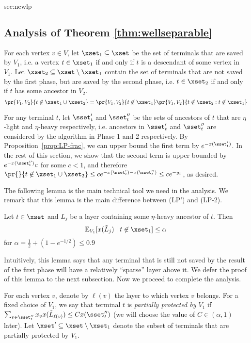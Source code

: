 \begin{appendixextra}{sec:newlp}{\subsection{Analysis of Theorem \ref{thm:wellseparable}}}
For each vertex $v \in V$, let $\xset_1 \subseteq \xset$ be the set of terminals that are saved by $V_1$, i.e. a vertex $t \in \xset_1$ if and only if $t$ is a descendant of some vertex in $V_1$.  
Let $\xset_2 \subseteq \xset \setminus \xset_1$ contain the set of terminals that are not saved by the first phase, but are saved by the second phase, i.e. $t \in \xset_2$ if and only if $t$ has some ancestor in $V_2$.  
\[\pr{V_1, V_2}{t \not \in \xset_1 \cup \xset_2} = \pr{V_1, V_2}{t \not \in \xset_1}
                                  \pr{V_1, V_2}{t \not \in \xset_2 : t \not \in \xset_1}\]

\newcommand{\avgsumgoodterm}[0]{\ensuremath{\sum_{i \in \lset_{t,2}}x_{v_{i,t}} x(\tilde L_{i,t})}}

For any terminal $t$, let $\sset'_t$ and $\sset''_t$ be the sets of ancestors of $t$ that are $\eta$-light and $\eta$-heavy respectively, i.e. ancestors in $\sset'_t$ and $\sset''_t$ are considered by the algorithm in Phase 1 and 2 respectively. 
By Proposition~\ref{prop:LP-frac}, we can upper bound the first term by $e^{-x(\sset'_t)}$. 
In the rest of this section, we show that the second term is upper bounded by $e^{-x(\sset''_t)} c$ for some $c <1$, and therefore $\pr{}{t \not \in \xset_1 \cup \xset_2} \leq c e^{-x(\sset'_t) - x(\sset''_t)} \leq c e^{-y_t}$, as desired.   

The following lemma is the main technical tool we need in the analysis.
We remark that this lemma is the main difference between (LP') and (LP-2).  
\begin{lemma}
\label{newlp:advantage}
Let $t \in \xset$ and  $L_j$ be a
layer containing some $\eta$-heavy ancestor of $t$.  
Then 
\[{\mathbb E}_{V_1} [x(\tilde L_j) \mid t \not \in \xset_1] \leq  \alpha \]
for $\displaystyle{\alpha = \frac12 + (1-e^{-1/2}) \leq 0.9}$ 
\end{lemma}

Intuitively, this lemma says that any terminal that is still not saved by the result of the first phase will have a relatively ``sparse'' layer above it.   
We defer the proof of this lemma to the next subsection. 
Now we proceed to complete the analysis.  


For each vertex $v$, denote by $\ell(v)$ the layer to which vertex $v$ belongs. 
For a fixed choice of $V_1$, we say that terminal $t$ is {\em partially protected by $V_1$} if 
$\sum_{ v \in \sset''_t} x_v x(\tilde L_{\ell(v)}) \leq C x(\sset''_t)$ (we will choose the value of $C \in (\alpha,1)$ later).
Let $\xset' \subseteq \xset \setminus \xset_1$ denote the subset of terminals that are partially protected by $V_1$.  


\end{appendixextra}

